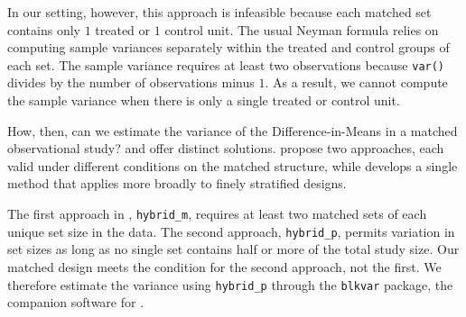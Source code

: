 \documentclass[
  12pt,
  leqno]{article}
\newenvironment{Shaded}{\begin{snugshade}}{\end{snugshade}}
\newcommand{\AttributeTok}[1]{\textcolor[rgb]{0.13,0.29,0.53}{#1}}
\newcommand{\CommentTok}[1]{\textcolor[rgb]{0.56,0.35,0.01}{\textit{#1}}}
\newcommand{\FunctionTok}[1]{\textcolor[rgb]{0.13,0.29,0.53}{\textbf{#1}}}
\newcommand{\NormalTok}[1]{#1}
\newcommand{\OtherTok}[1]{\textcolor[rgb]{0.56,0.35,0.01}{#1}}
\newcommand{\SpecialCharTok}[1]{\textcolor[rgb]{0.81,0.36,0.00}{\textbf{#1}}}
\newcommand{\StringTok}[1]{\textcolor[rgb]{0.31,0.60,0.02}{#1}}
\begin{document}
In our setting, however, this approach is infeasible because each
matched set contains only \(1\) treated or \(1\) control unit. The usual
Neyman formula relies on computing sample variances separately within
the treated and control groups of each set. The sample variance requires
at least two observations because \texttt{var()} divides by the number
of observations minus \(1\). As a result, we cannot compute the sample
variance when there is only a single treated or control unit.

How, then, can we estimate the variance of the Difference-in-Means in a
matched observational study? \citet{pashleymiratrix2021} and
\citet{fogarty2018} offer distinct solutions.
\citet{pashleymiratrix2021} propose two approaches, each valid under
different conditions on the matched structure, while \citet{fogarty2018}
develops a single method that applies more broadly to finely stratified
designs.

The first approach in \citet{pashleymiratrix2021}, \texttt{hybrid\_m},
requires at least two matched sets of each unique set size in the data.
The second approach, \texttt{hybrid\_p}, permits variation in set sizes
as long as no single set contains half or more of the total study size.
Our matched design meets the condition for the second approach, not the
first. We therefore estimate the variance using \texttt{hybrid\_p}
through the \texttt{blkvar} package, the companion software for
\citet{pashleymiratrix2021}.

\singlespacing

\begin{Shaded}
\end{Shaded}
\end{document}
